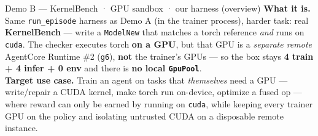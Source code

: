 \documentclass[aspectratio=169]{beamer}
\begin{document}
\begin{frame}{Demo B --- KernelBench · GPU sandbox · our harness (overview)}
  \footnotesize\textbf{What it is.} Same \texttt{run\_episode} harness as Demo A (in the trainer
  process), harder task: real \textbf{KernelBench} --- write a \texttt{ModelNew} that matches a torch
  reference \emph{and} runs on \texttt{cuda}. The checker executes torch \textbf{on a GPU}, but that
  GPU is a \emph{separate remote} AgentCore Runtime \#2 (\texttt{g6}), \textbf{not} the trainer's GPUs
  --- so the box stays \textbf{4 train + 4 infer + 0 env} and there is \textbf{no local \texttt{GpuPool}}.
  \vspace{0.15em}\\{\scriptsize\textbf{Target use case.} Train an agent on tasks that \emph{themselves}
  need a GPU --- write/repair a CUDA kernel, make torch run on-device, optimize a fused op ---
  where reward can only be earned by running on \texttt{cuda}, while keeping every trainer GPU on the
  policy and isolating untrusted CUDA on a disposable remote instance.}
  \begin{center}
  \end{center}
\end{frame}
\end{document}
